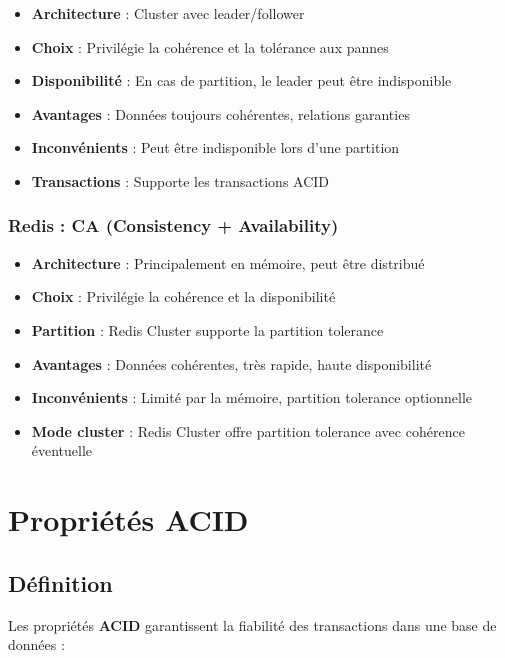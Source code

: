 \documentclass[11pt,a4paper]{article}
\begin{document}
\begin{itemize}
    \item \textbf{Architecture} : Cluster avec leader/follower
    \item \textbf{Choix} : Privilégie la cohérence et la tolérance aux pannes
    \item \textbf{Disponibilité} : En cas de partition, le leader peut être indisponible
    \item \textbf{Avantages} : Données toujours cohérentes, relations garanties
    \item \textbf{Inconvénients} : Peut être indisponible lors d'une partition
    \item \textbf{Transactions} : Supporte les transactions ACID
\end{itemize}

\subsubsection{Redis : CA (Consistency + Availability)}

\begin{itemize}
    \item \textbf{Architecture} : Principalement en mémoire, peut être distribué
    \item \textbf{Choix} : Privilégie la cohérence et la disponibilité
    \item \textbf{Partition} : Redis Cluster supporte la partition tolerance
    \item \textbf{Avantages} : Données cohérentes, très rapide, haute disponibilité
    \item \textbf{Inconvénients} : Limité par la mémoire, partition tolerance optionnelle
    \item \textbf{Mode cluster} : Redis Cluster offre partition tolerance avec cohérence éventuelle
\end{itemize}

\newpage

\section{Propriétés ACID}

\subsection{Définition}

Les propriétés \textbf{ACID} garantissent la fiabilité des transactions dans une base de données :
\end{document}
